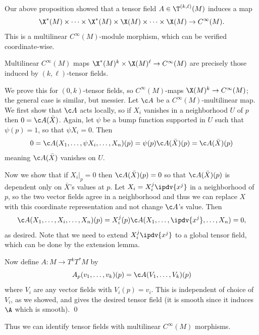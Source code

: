 \eproof

Our above proposition showed that a tensor field $A\in\T^{(k,\ell)}(M)$ induces a map
$$ \X^*(M)\times\cdots\times\X^*(M)\times\X(M)\times\cdots\times\X(M)\to C^\infty(M) . $$
This is a multilinear $C^\infty(M)$-module morphism, which can be verified coordinate-wise.

\blemm

    Multilinear $C^\infty(M)$ maps $\X^*(M)^k\times\X(M)^\ell\to C^\infty(M)$ are precisely those induced by $(k,\ell)$-tensor fields.

\elemm

\bproof

    We prove this for $(0,k)$-tensor fields, so $C^\infty(M)$-maps $\X(M)^k\to C^\infty(M)$; the general case is similar, but messier.
    Let $\c A$ be a $C^\infty(M)$-multilinear map.
    We first show that $\c A$ acts locally, so if $X_i$ vanishes in a neighborhood $U$ of $p$ then $0=\c A(\bar X)$.
    Again, let $\psi$ be a bump function supported in $U$ such that $\psi(p)=1$, so that $\psi X_i=0$.
    Then
    $$ 0 = \c A(X_1,\dots,\psi X_i,\dots,X_n)(p) = \psi(p)\c A(\bar X)(p) = \c A(\bar X)(p) $$
    meaning $\c A(\bar X)$ vanishes on $U$.

    Now we show that if $X_i|_p=0$ then $\c A(\bar X)(p)=0$ so that $\c A(\bar X)(p)$ is dependent only on $\bar X$'s values at $p$.
    Let $X_i=X^j_i\ipdv{x^j}$ in a neighborhood of $p$, so the two vector fields agree in a neighborhood and thus we can replace $X$ with this coordinate
    representation and not change $\c A$'s value.
    Then
    $$ \c A(X_1,\dots,X_i,\dots,X_n)(p) = X^j_i(p)\c A(X_1,\dots,\ipdv{x^j},\dots,X_n) = 0 , $$
    as desired.
    Note that we need to extend $X^j_i\ipdv{x^j}$ to a global tensor field, which can be done by the extension lemma.

    Now define $A\colon M\to T^kT^*M$ by
    $$ A_p(v_1,\dots,v_k)(p) = \c A(V_1,\dots,V_k)(p) $$
    where $V_i$ are any vector fields with $V_i(p)=v_i$.
    This is independent of choice of $V_i$, as we showed, and gives the desired tensor field (it is smooth since it induces $\A$ which is smooth).
    \qed

\eproof

Thus we can identify tensor fields with multilinear $C^\infty(M)$ morphisms.

